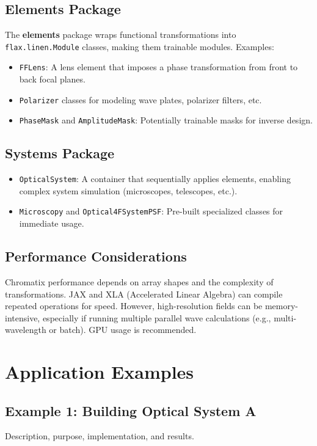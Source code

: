 \documentclass[a4paper,12pt]{report}
\begin{document}
\section{Elements Package}
The \textbf{elements} package wraps functional transformations into \texttt{flax.linen.Module} classes, making them trainable modules. Examples:
\begin{itemize}
    \item \texttt{FFLens}: A lens element that imposes a phase transformation from front to back focal planes.
    \item \texttt{Polarizer} classes for modeling wave plates, polarizer filters, etc.
    \item \texttt{PhaseMask} and \texttt{AmplitudeMask}: Potentially trainable masks for inverse design.
\end{itemize}

\section{Systems Package}
\begin{itemize}
    \item \texttt{OpticalSystem}: A container that sequentially applies elements, enabling complex system simulation (microscopes, telescopes, etc.).
    \item \texttt{Microscopy} and \texttt{Optical4FSystemPSF}: Pre-built specialized classes for immediate usage.
\end{itemize}

\section{Performance Considerations}
Chromatix performance depends on array shapes and the complexity of transformations. JAX and XLA (Accelerated Linear Algebra) can compile repeated operations for speed. However, high-resolution fields can be memory-intensive, especially if running multiple parallel wave calculations (e.g., multi-wavelength or batch). GPU usage is recommended.

\chapter{Application Examples}
\section{Example 1: Building Optical System A}
Description, purpose, implementation, and results.
\end{document}
